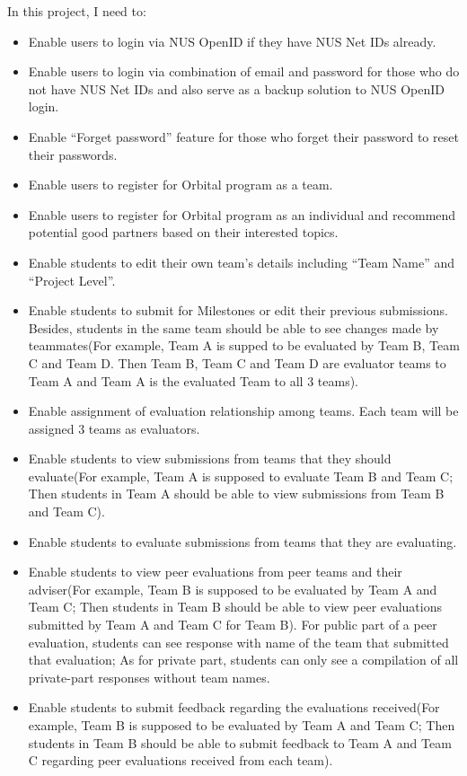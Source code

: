 In this project, I need to:
\begin{itemize}
  \item Enable users to login via NUS OpenID if they have NUS Net IDs already.
  \item Enable users to login via combination of email and password for those who do not have NUS Net IDs and also serve as a backup solution to NUS OpenID login.
  \item Enable ``Forget password'' feature for those who forget their password to reset their passwords.
  \item Enable users to register for Orbital program as a team.
  \item Enable users to register for Orbital program as an individual and recommend potential good partners based on their interested topics.
  \item Enable students to edit their own team's details including ``Team Name'' and ``Project Level''.
  \item Enable students to submit for Milestones or edit their previous submissions. Besides, students in the same team should be able to see changes made by teammates(For example, Team A is supped to be evaluated by Team B, Team C and Team D. Then Team B, Team C and Team D are evaluator teams to Team A and Team A is the evaluated Team to all 3 teams).
  \item Enable assignment of evaluation relationship among teams. Each team will be assigned 3 teams as evaluators.
  \item Enable students to view submissions from teams that they should evaluate(For example, Team A is supposed to evaluate Team B and Team C; Then students in Team A should be able to view submissions from Team B and Team C).
  \item Enable students to evaluate submissions from teams that they are evaluating.
  \item Enable students to view peer evaluations from peer teams and their adviser(For example, Team B is supposed to be evaluated by Team A and Team C; Then students in Team B should be able to view peer evaluations submitted by Team A and Team C for Team B). For public part of a peer evaluation, students can see response with name of the team that submitted that evaluation; As for private part, students can only see a compilation of all private-part responses without team names.
  \item Enable students to submit feedback regarding the evaluations received(For example, Team B is supposed to be evaluated by Team A and Team C; Then students in Team B should be able to submit feedback to Team A and Team C regarding peer evaluations received from each team).

\end{itemize}
